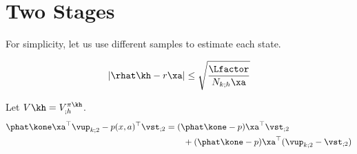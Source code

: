 

\newcommand{\nkh}{N_{k;h}}
\newcommand{\ktwo}{_{k;2}}
\newcommand{\vsttwo}{\vst_{;2}}


\section{Two Stages}

For simplicity, let us use different samples to estimate each state. 


\begin{align*}
   |\rhat\kh - r\xa| \le \sqrt{\frac{\Lfactor}{\nkh\xa}}
\end{align*}

Let $V\kh = V^{\pi\kh}_{;h}$. 
\begin{align*}
   \phat\kone\xa^\top \vup\ktwo - p(x,a)^\top \vsttwo  &=    (\phat\kone - p)\xa^\top \vsttwo \\
   &\qquad+ (\phat\kone - p)\xa^\top(\vup\ktwo - \vsttwo)
\end{align*}

